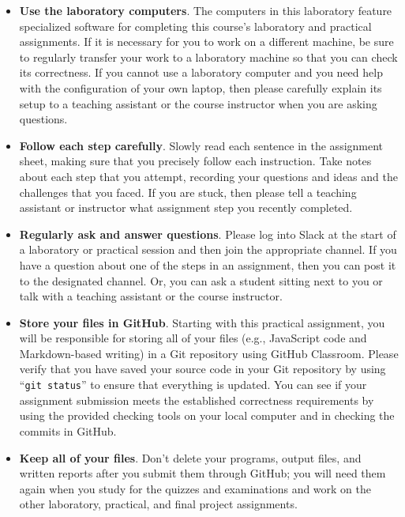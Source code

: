 \documentclass[11pt]{article}
\newcommand{\command}[1]{``\lstinline{#1}''}
\begin{document}
\begin{itemize}
  \setlength{\itemsep}{0pt}

\item {\bf Use the laboratory computers}. The computers in this laboratory feature specialized software for completing
  this course's laboratory and practical assignments. If it is necessary for you to work on a different machine, be sure
  to regularly transfer your work to a laboratory machine so that you can check its correctness. If you cannot use a
  laboratory computer and you need help with the configuration of your own laptop, then please carefully explain its
  setup to a teaching assistant or the course instructor when you are asking questions.

\item {\bf Follow each step carefully}. Slowly read each sentence in the assignment sheet, making sure that you
  precisely follow each instruction. Take notes about each step that you attempt, recording your questions and ideas and
  the challenges that you faced. If you are stuck, then please tell a teaching assistant or instructor what assignment
  step you recently completed.

\item {\bf Regularly ask and answer questions}. Please log into Slack at the start of a laboratory or practical session
  and then join the appropriate channel. If you have a question about one of the steps in an assignment, then you can
  post it to the designated channel. Or, you can ask a student sitting next to you or talk with a teaching assistant or
  the course instructor.

\item {\bf Store your files in GitHub}. Starting with this practical assignment, you will be responsible for storing
  all of your files (e.g., JavaScript code and Markdown-based writing) in a Git repository using GitHub Classroom.
  Please verify that you have saved your source code in your Git repository by using \command{git status} to ensure that
  everything is updated. You can see if your assignment submission meets the established correctness requirements by
  using the provided checking tools on your local computer and in checking the commits in GitHub.

\item {\bf Keep all of your files}. Don't delete your programs, output files, and written reports after you submit them
  through GitHub; you will need them again when you study for the quizzes and examinations and work on the other
  laboratory, practical, and final project assignments.


\end{itemize}
\end{document}
